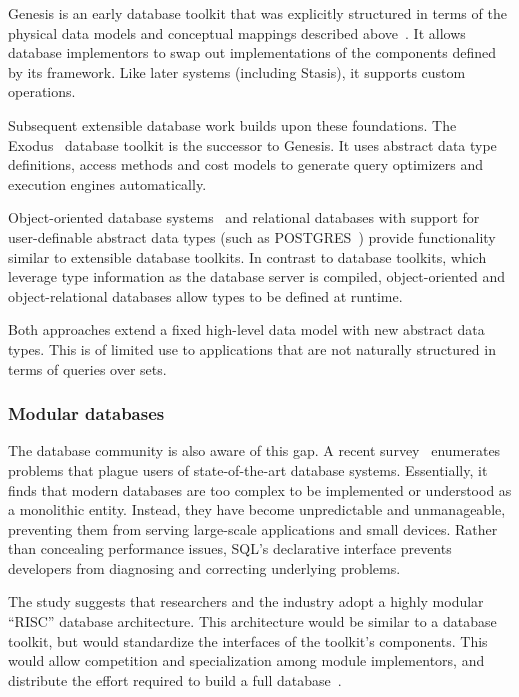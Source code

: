 \documentclass[letterpaper,twocolumn,10pt]{article}
\newcommand{\yad}{Stasis\xspace}
\begin{document}
Genesis is an early database toolkit that was explicitly structured in
terms of the physical data models and conceptual mappings described
above~\cite{genesis}.  It allows database implementors to swap out
implementations of the components defined by its framework.  Like
later systems (including \yad), it supports custom operations.

Subsequent extensible database work builds upon these foundations.
The Exodus~\cite{exodus} database toolkit is the successor to
Genesis. It uses abstract data type definitions, access methods and
cost models to  generate query optimizers and execution
engines automatically.

Object-oriented database systems~\cite{objectstore} and
relational databases with support for user-definable abstract data
types (such as POSTGRES~\cite{postgres}) provide functionality
similar to extensible database toolkits.  In contrast to database
toolkits, which leverage type information as the database server is
compiled, object-oriented and object-relational databases allow types
to be defined at runtime.

Both approaches extend a fixed high-level data model with new
abstract data types.  This is of limited use to applications that are
not naturally structured in terms of queries over sets.

\subsubsection{Modular databases}

 The database community is also aware of this gap.  A recent
survey~\cite{riscDB} enumerates problems that plague users of
state-of-the-art database systems.  Essentially, it finds that modern
databases are too complex to be implemented or understood as a
monolithic entity.  Instead, they have become unpredictable and
unmanageable, preventing them from serving large-scale applications and
small devices.  Rather than concealing performance issues, SQL's
declarative interface prevents developers from diagnosing and
correcting underlying problems.

The study suggests that researchers and the industry adopt a highly
modular ``RISC'' database architecture.  This architecture would be
similar to a database toolkit, but would standardize the interfaces of
the toolkit's components.  This would allow competition and
specialization among module implementors, and distribute the effort
required to build a full database~\cite{riscDB}.
\end{document}
